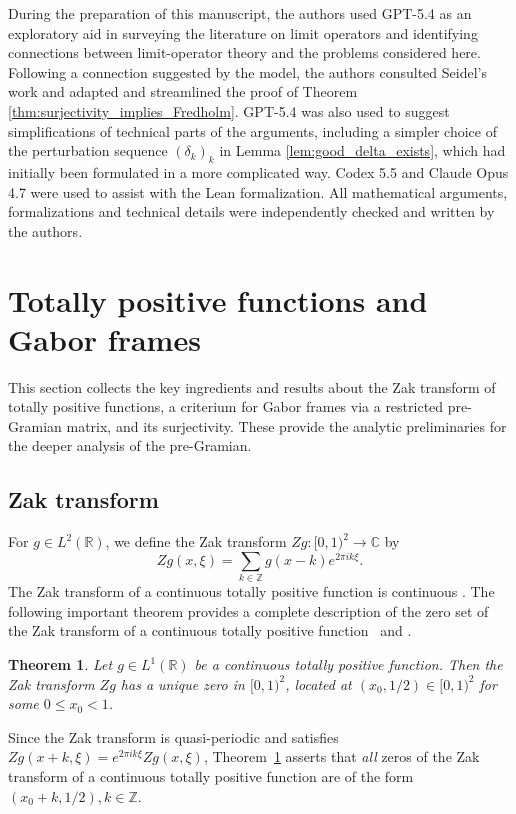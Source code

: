\documentclass[reqno,a4paper,12pt]{amsart}
\numberwithin{equation}{section}
\newtheorem{theorem}[definition]{Theorem}
\def\Z{{\mathbb Z}}
\def\R{{\mathbb R}}
\def\C{{\mathbb C}}
\newcommand\1{\mathds{1}}
\begin{document}
During the preparation of this manuscript, the authors used GPT-5.4 as an exploratory aid in surveying the literature on limit operators and identifying connections between limit-operator theory and the problems considered here. Following a connection suggested by the model, the authors consulted Seidel's work \cite{seidel2015semi} and adapted and streamlined the proof of Theorem \ref{thm:surjectivity_implies_Fredholm}. GPT-5.4 was also used to suggest simplifications of technical parts of the arguments, including a simpler choice of the perturbation sequence $(\delta_k)_k$ in Lemma \ref{lem:good_delta_exists}, which had initially been formulated in a more complicated way. Codex 5.5 and Claude Opus 4.7 were used to assist with the Lean formalization. All mathematical arguments, formalizations and technical details were independently checked and written by the authors.


\section{Totally positive functions and Gabor frames}

This section collects the key ingredients and results about the Zak
transform of totally positive functions, a criterium for Gabor frames
via a restricted pre-Gramian matrix, and its surjectivity. These
provide the analytic preliminaries for the deeper analysis of the
pre-Gramian.

\subsection{Zak transform}

For $g \in L^2(\R)$, we define the Zak transform $Zg : [0,1)^2 \to \C$ by
$$
Zg(x,\xi)=\sum_{k\in \Z} g(x-k)e^{2\pi i k\xi}.
$$
The Zak transform of a continuous totally positive function is continuous \cite[Thm.~8.2.1.~(c)]{Groechenig2001}.
The following important theorem provides a complete description of the
zero set of the Zak transform of a  continuous totally positive
function~\cite[Thm.~1]{VinogradovUlitskaya2017} and \cite{KS14,Klo15}. 

\begin{theorem}\label{prop:zak-zero}
Let $g \in L^1(\R)$ be a continuous totally positive function. Then the Zak transform $Zg$ has a unique zero in $[0,1)^2$, located at $(x_0,1/2) \in [0,1)^2$ for some
$0 \leq x_0<1$.
\end{theorem}
Since the Zak transform is quasi-periodic and satisfies $Zg(x+k, \xi )
= e^{2\pi i k \xi } Zg(x,\xi )$, Theorem~\ref{prop:zak-zero} asserts
that \emph{all} zeros of the Zak transform of a continuous totally
positive function are of the form $(x_0 + k, 1/2), k\in \Z $. 
\end{document}
